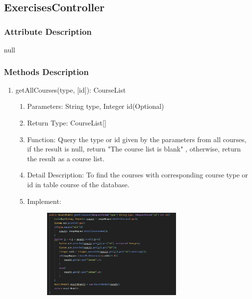\documentclass[16pt]{scrreprt}
\begin{document}
\subsection{ExercisesController}
\subsubsection{Attribute Description}
null
\subsubsection{Methods Description}
\begin{enumerate}
    \item getAllCourses(type, [id]): CourseList
    \begin{enumerate}
        \item Parameters: String type, Integer id(Optional)
        \item Return Type: CourseList[]
        \item Function: Query the type or id given by the parameters from all courses, if the result is null, return "The course list is blank" , otherwise, return the result as a course list.
        \item Detail Description: To find the courses with corresponding course type or id in table course of the database.
        \item Implement:
        \begin{figure}[H]
    \centering
    \includegraphics[width=0.7\textwidth]{diagrams/getAllCourses.png}\\
\end{figure}
    \end{enumerate}
    

\end{enumerate}
\end{document}
